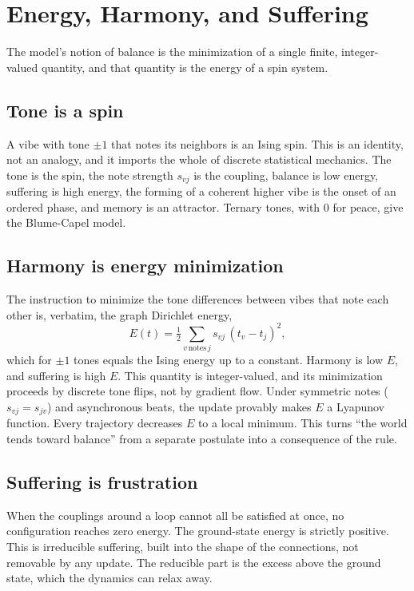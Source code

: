 \section{Energy, Harmony, and Suffering}
\label{sec:energy}

The model's notion of balance is the minimization of a single finite, integer-valued quantity, and that quantity is the energy of a spin system.

\subsection{Tone is a spin}

A vibe with tone $\pm 1$ that notes its neighbors is an Ising spin. This is an identity, not an analogy, and it imports the whole of discrete statistical mechanics. The tone is the spin, the note strength $s_{vj}$ is the coupling, balance is low energy, suffering is high energy, the forming of a coherent higher vibe is the onset of an ordered phase, and memory is an attractor. Ternary tones, with $0$ for peace, give the Blume-Capel model.

\subsection{Harmony is energy minimization}

The instruction to minimize the tone differences between vibes that note each other is, verbatim, the graph Dirichlet energy,
\[
E(t) = \tfrac{1}{2} \sum_{v \,\text{notes}\, j} s_{vj}\,(t_v - t_j)^2,
\]
which for $\pm 1$ tones equals the Ising energy up to a constant. Harmony is low $E$, and suffering is high $E$. This quantity is integer-valued, and its minimization proceeds by discrete tone flips, not by gradient flow. Under symmetric notes ($s_{vj} = s_{jv}$) and asynchronous beats, the update provably makes $E$ a Lyapunov function. Every trajectory decreases $E$ to a local minimum. This turns ``the world tends toward balance'' from a separate postulate into a consequence of the rule.

\subsection{Suffering is frustration}

When the couplings around a loop cannot all be satisfied at once, no configuration reaches zero energy. The ground-state energy is strictly positive. This is irreducible suffering, built into the shape of the connections, not removable by any update. The reducible part is the excess above the ground state, which the dynamics can relax away.

